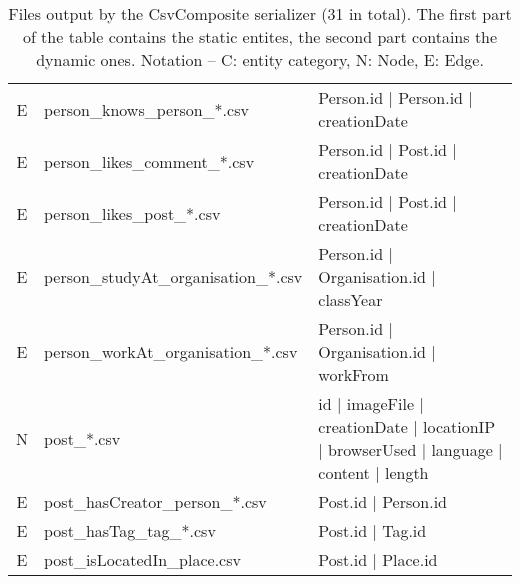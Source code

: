 \begin{table}[htb]
\begin{tabular}{|c|p{4.6cm}|p{11.4cm}|}
        E                       & person\_knows\_person\_*.csv            & Person.id | Person.id | creationDate                                                                        \\
        E                       & person\_likes\_comment\_*.csv           & Person.id | Post.id | creationDate                                                                          \\
        E                       & person\_likes\_post\_*.csv              & Person.id | Post.id | creationDate                                                                          \\
        E                       & person\_studyAt\_organisation\_*.csv    & Person.id | Organisation.id | classYear                                                                     \\
        E                       & person\_workAt\_organisation\_*.csv     & Person.id | Organisation.id | workFrom                                                                      \\
		\hline
        N                       & post\_*.csv                             & id | imageFile | creationDate | locationIP | browserUsed | language | content | length                      \\
        E                       & post\_hasCreator\_person\_*.csv         & Post.id | Person.id                                                                                         \\
        E                       & post\_hasTag\_tag\_*.csv                & Post.id | Tag.id                                                                                            \\
        E                       & post\_isLocatedIn\_place.csv            & Post.id | Place.id                                                                                          \\
        \hline
    \end{tabular}
    \caption{Files output by the CsvComposite serializer (31 in total). The first part of the table contains the static entites, the second part contains the dynamic ones. Notation -- C: entity category, N: Node, E: Edge.}
    \label{table:csv_composite}
\end{table}
